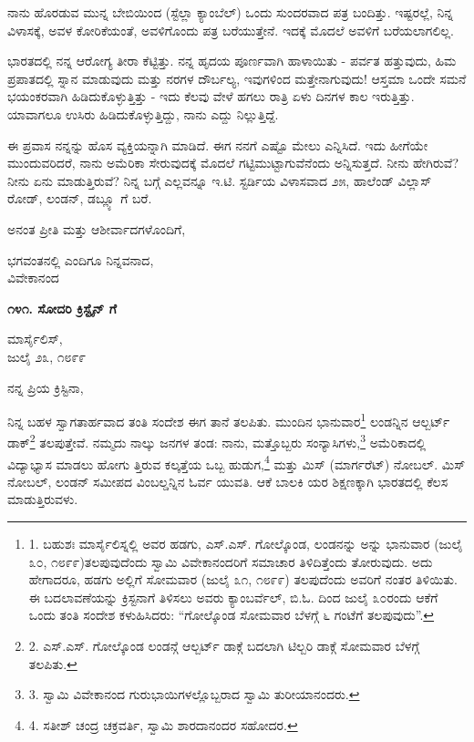 ನಾನು ಹೊರಡುವ ಮುನ್ನ ಬೇಬಿಯಿಂದ (ಸ್ಟೆಲ್ಲಾ ಕ್ಯಾಂಬೆಲ್) ಒಂದು ಸುಂದರವಾದ ಪತ್ರ ಬಂದಿತ್ತು. ಇಷ್ಟರಲ್ಲೆ, ನಿನ್ನ ವಿಳಾಸಕ್ಕೆ, ಅವಳ ಕೋರಿಕೆಯಂತೆ, ಅವಳಿಗೊಂದು ಪತ್ರ ಬರೆಯುತ್ತೇನೆ. ಇದಕ್ಕೆ ಮೊದಲೆ ಅವಳಿಗೆ ಬರೆಯಲಾಗಲಿಲ್ಲ.

ಭಾರತದಲ್ಲಿ ನನ್ನ ಆರೋಗ್ಯ ತೀರಾ ಕೆಟ್ಟಿತ್ತು. ನನ್ನ ಹೃದಯ ಪೂರ್ಣವಾಗಿ ಹಾಳಾಯಿತು - ಪರ್ವತ ಹತ್ತುವುದು, ಹಿಮ ಪ್ರಪಾತದಲ್ಲಿ ಸ್ನಾನ ಮಾಡುವುದು ಮತ್ತು ನರಗಳ ದೌರ್ಬಲ್ಯ, ಇವುಗಳಿಂದ ಮತ್ತೇನಾಗುವುದು! ಆಸ್ತಮಾ ಒಂದೇ ಸಮನೆ ಭಯಂಕರವಾಗಿ ಹಿಡಿದುಕೊಳ್ಳುತ್ತಿತ್ತು - ಇದು ಕೆಲವು ವೇಳೆ ಹಗಲು ರಾತ್ರಿ ಏಳು ದಿನಗಳ ಕಾಲ ಇರುತ್ತಿತ್ತು. ಯಾವಾಗಲೂ ಉಸಿರು ಹಿಡಿದುಕೊಳ್ಳುತ್ತಿದ್ದು, ನಾನು ಎದ್ದು ನಿಲ್ಲುತ್ತಿದ್ದೆ.

ಈ ಪ್ರವಾಸ ನನ್ನನ್ನು ಹೊಸ ವ್ಯಕ್ತಿಯನ್ನಾಗಿ ಮಾಡಿದೆ. ಈಗ ನನಗೆ ಎಷ್ಟೊ ಮೇಲು ಎನ್ನಿಸಿದೆ. ಇದು ಹೀಗೆಯೇ ಮುಂದುವರಿದರೆ, ನಾನು ಅಮೆರಿಕಾ ಸೇರುವುದಕ್ಕೆ ಮೊದಲೆ ಗಟ್ಟಿಮುಟ್ಟಾಗುವೆನೆಂದು ಅನ್ನಿಸುತ್ತದೆ. ನೀನು ಹೇಗಿರುವೆ? ನೀನು ಏನು ಮಾಡುತ್ತಿರುವೆ? ನಿನ್ನ ಬಗ್ಗೆ ಎಲ್ಲವನ್ನೂ ಇ.ಟಿ. ಸ್ಟರ್ಡಿಯ ವಿಳಾಸವಾದ ೨೫, ಹಾಲೆಂಡ್ ವಿಲ್ಲಾಸ್ ರೋಡ್, ಲಂಡನ್, ಡಬ್ಲ್ಯೂ ಗೆ ಬರೆ.

ಅನಂತ ಪ್ರೀತಿ ಮತ್ತು ಆಶೀರ್ವಾದಗಳೊಂದಿಗೆ,

\begin{flushright}
ಭಗವಂತನಲ್ಲಿ ಎಂದಿಗೂ ನಿನ್ನವನಾದ,\\ವಿವೇಕಾನಂದ
\end{flushright}

\begin{center}
\textbf{೧೪೧. ಸೋದರಿ ಕ್ರಿಸ್ಟೈನ್ ಗೆ}
\end{center}

\begin{flushright}
ಮಾರ್ಸೈಲಿಸ್,\\ಜುಲೈ ೨೩, ೧೮೯೯
\end{flushright}

ನನ್ನ ಪ್ರಿಯ ಕ್ರಿಸ್ಟಿನಾ,

ನಿನ್ನ ಬಹಳ ಸ್ವಾಗತಾರ್ಹವಾದ ತಂತಿ ಸಂದೇಶ ಈಗ ತಾನೆ ತಲಪಿತು. ಮುಂದಿನ ಭಾನುವಾರ\footnote{1. ಬಹುಶಃ ಮಾರ್ಸೈಲಿಸ್ನಲ್ಲಿ ಅವರ ಹಡಗು, ಎಸ್.ಎಸ್. ಗೋಲ್ಕೊಂಡ, ಲಂಡನನ್ನು ಅನ್ನು ಭಾನುವಾರ (ಜುಲೈ ೩೦, ೧೮೯೯)ತಲಪುವುದೆಂದು ಸ್ವಾಮಿ ವಿವೇಕಾನಂದರಿಗೆ ಸಮಾಚಾರ ತಿಳಿದಿತ್ತೆಂದು ತೋರುವುದು. ಅದು ಹೇಗಾದರೂ, ಹಡಗು ಅಲ್ಲಿಗೆ ಸೋಮವಾರ (ಜುಲೈ ೩೧, ೧೮೯೯) ತಲಪುದೆಂದು ಅವರಿಗೆ ನಂತರ ತಿಳಿಯಿತು. ಈ ಬದಲಾವಣೆಯನ್ನು ಕ್ರಿಸ್ಟನಾಗೆ ತಿಳಿಸಲು ಅವರು ಕ್ಯಾಂಬರ್ವೆಲ್, ಬಿ.ಓ. ದಿಂದ ಜುಲೈ ೩೦ರಂದು ಆಕೆಗೆ ಒಂದು ತಂತಿ ಸಂದೇಶ ಕಳುಹಿಸಿದರು: “ಗೋಲ್ಕೊಂಡ ಸೋಮವಾರ ಬೆಳಗ್ಗೆ ೬ ಗಂಟೆಗೆ ತಲಪುವುದು”.} ಲಂಡನ್ನಿನ ಆಲ್ಬರ್ಟ್ ಡಾಕ್\footnote{2. ಎಸ್.ಎಸ್. ಗೋಲ್ಕೊಂಡ ಲಂಡನ್ಗೆ ಆಲ್ಬರ್ಟ್ ಡಾಕ್ಗೆ ಬದಲಾಗಿ ಟಿಲ್ಬರಿ ಡಾಕ್ಗೆ ಸೋಮವಾರ ಬೆಳಗ್ಗೆ ತಲಪಿತು.} ತಲಪುತ್ತೇವೆ. ನಮ್ಮದು ನಾಲ್ಕು ಜನಗಳ ತಂಡ: ನಾನು, ಮತ್ತೊಬ್ಬರು ಸಂನ್ಯಾಸಿಗಳು,\footnote{3. ಸ್ವಾಮಿ ವಿವೇಕಾನಂದ ಗುರುಭಾಯಿಗಳಲ್ಲೊಬ್ಬರಾದ ಸ್ವಾಮಿ ತುರೀಯಾನಂದರು.} ಅಮೆರಿಕಾದಲ್ಲಿ ವಿದ್ಯಾಭ್ಯಾಸ ಮಾಡಲು ಹೋಗು ತ್ತಿರುವ ಕಲ್ಕತ್ತೆಯ ಒಬ್ಬ ಹುಡುಗ,\footnote{4. ಸತೀಶ್ ಚಂದ್ರ ಚಕ್ರವರ್ತಿ, ಸ್ವಾಮಿ ಶಾರದಾನಂದರ ಸಹೋದರ.} ಮತ್ತು ಮಿಸ್ (ಮಾರ್ಗರೆಟ್) ನೋಬಲ್. ಮಿಸ್ ನೋಬಲ್, ಲಂಡನ್ ಸಮೀಪದ ವಿಂಬಲ್ಡನ್ನಿನ ಓರ್ವ ಯುವತಿ. ಆಕೆ ಬಾಲಕಿ ಯರ ಶಿಕ್ಷಣಕ್ಕಾಗಿ ಭಾರತದಲ್ಲಿ ಕೆಲಸ ಮಾಡುತ್ತಿರುವಳು.

